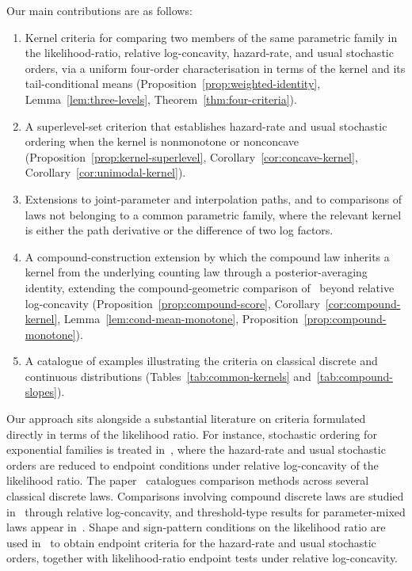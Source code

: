 \documentclass[11pt]{article}
\begin{document}
Our main contributions are as follows:
\begin{enumerate}[label=\textup{(\roman*)}]
\item Kernel criteria for comparing two members of the same parametric family in the likelihood-ratio, relative log-concavity, hazard-rate, and usual stochastic orders, via a uniform four-order characterisation in terms of the kernel and its tail-conditional means (Proposition~\ref{prop:weighted-identity}, Lemma~\ref{lem:three-levels}, Theorem~\ref{thm:four-criteria}).


\item A superlevel-set criterion that establishes hazard-rate and usual stochastic ordering when the kernel is nonmonotone or nonconcave (Proposition~\ref{prop:kernel-superlevel}, Corollary~\ref{cor:concave-kernel}, Corollary~\ref{cor:unimodal-kernel}).


\item Extensions to joint-parameter and interpolation paths, and to comparisons of laws not belonging to a common parametric family, where the relevant kernel is either the path derivative or the difference of two log factors.


\item A compound-construction extension by which the compound law inherits a kernel from the underlying counting law through a posterior-averaging identity, extending the compound-geometric comparison of~\cite{XiaLv2024} beyond relative log-concavity (Proposition~\ref{prop:compound-score}, Corollary~\ref{cor:compound-kernel}, Lemma~\ref{lem:cond-mean-monotone}, Proposition~\ref{prop:compound-monotone}).


\item A catalogue of examples illustrating the criteria on classical discrete and continuous distributions (Tables~\ref{tab:common-kernels} and~\ref{tab:compound-slopes}).
\end{enumerate}

Our approach sits alongside a substantial literature on criteria formulated directly in terms of the likelihood ratio. For instance, stochastic ordering for exponential families is treated in~\cite{Yu2009}, where the hazard-rate and usual stochastic orders are reduced to endpoint conditions under relative log-concavity of the likelihood ratio. The paper~\cite{KlenkeMattner2010} catalogues comparison methods across several classical discrete laws. Comparisons involving compound discrete laws are studied in~\cite{XiaLv2024} through relative log-concavity, and threshold-type results for parameter-mixed laws appear in~\cite{MisraSinghHarner2003,AlamatsazAbbasi2008,PudprommaratBodhisuwan2012}. Shape and sign-pattern conditions on the likelihood ratio are used in~\cite{DerbaziPairwise} to obtain endpoint criteria for the hazard-rate and usual stochastic orders, together with likelihood-ratio endpoint tests under relative log-concavity.
\end{document}
